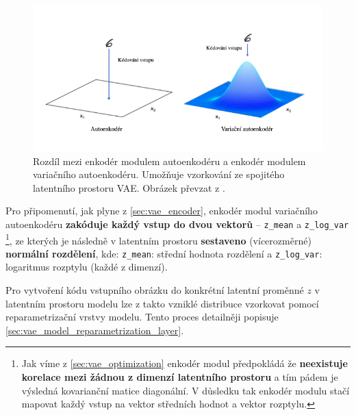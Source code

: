 \begin{figure}[H]
    \centering
    \includegraphics[width=\textwidth]{figures/vae_encoder_module.png}
    \caption{Rozdíl mezi enkodér modulem autoenkodéru a enkodér modulem variačního autoenkodéru. Umožňuje vzorkování ze spojitého latentního prostoru VAE. Obrázek převzat z \textcite{Foster2023}.}
    \label{fig:vae_encoder_difference}
\end{figure}

Pro připomenutí, jak plyne z \autoref{sec:vae_encoder}, enkodér modul variačního autoenkodéru \textbf{zakóduje každý vstup do dvou vektorů} – \lstinline{z_mean} a \lstinline{z_log_var}
\footnote{Jak víme z \autoref{sec:vae_optimization} enkodér modul předpokládá že \textbf{neexistuje korelace mezi žádnou z dimenzí latentního prostoru} a tím pádem je výsledná kovarianční matice diagonální. V důsledku tak enkodér modulu stačí mapovat každý vstup na vektor středních hodnot a vektor rozptylu.},
ze kterých je následně v latentním prostoru \textbf{sestaveno} (vícerozměrné) \textbf{normální rozdělení}, kde:
\lstinline{z_mean}: střední hodnota rozdělení a \lstinline{z_log_var}: logaritmus rozptylu (každé z dimenzí).

Pro vytvoření kódu vstupního obrázku do konkrétní latentní proměnné $z$ v latentním prostoru modelu lze z takto vzniklé distribuce vzorkovat pomocí reparametrizační vrstvy modelu. Tento proces detailněji popisuje \autoref{sec:vae_model_reparametrization_layer}.

